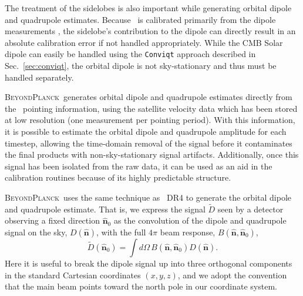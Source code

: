 \documentclass[twocolumn]{aa}
\newcommand{\BP}{\textsc{BeyondPlanck}}
\begin{document}
The treatment of the sidelobes is also important while generating orbital dipole and quadrupole estimates. Because \Planck\ is calibrated primarily from the dipole measurements \citep{planck2016-l01,npipe,BP07}, the sidelobe's contribution to the dipole can directly result in an absolute calibration error if not handled appropriately. While the CMB Solar dipole can easily be handled using the \texttt{Conviqt} approach described in Sec.~\ref{sec:conviqt}, the orbital dipole is not sky-stationary and thus must be handled separately. 

\BP\ generates orbital dipole and quadrupole estimates directly from the \Planck\ pointing information, using the satellite velocity data which has been stored at low resolution (one measurement per pointing period). With this information, it is possible to estimate the orbital dipole and quadrupole amplitude for each timestep, allowing the time-domain removal of the signal before it contaminates the final products with non-sky-stationary signal artifacts. Additionally, once this signal has been isolated from the raw data, it can be used as an aid in the calibration routines because of its highly predictable structure.


\BP\ uses the same technique as \Planck\ DR4 \citep[see appendix C]{npipe} to generate the orbital dipole and quadrupole estimate. That is, we express the signal $\tilde{D}$ seen by a detector observing a fixed direction $\hat{\boldsymbol n}_0$ as the convolution of the dipole and quadrupole signal on the sky, $D(\hat{\boldsymbol n})$, with the full $4\pi$ beam response, $B(\hat{\boldsymbol n}, \hat{\boldsymbol n}_0)$,
\begin{equation}
\tilde{D}(\hat{\boldsymbol n}_0) = \int d\Omega\, B(\hat{\boldsymbol n}, \hat{\boldsymbol n}_0) D(\hat{\boldsymbol n}).
\end{equation}
Here it is useful to break the dipole signal up into three orthogonal components in the standard Cartesian coordinates $(x,y,z)$, and we adopt the convention that the main beam points toward the north pole in our coordinate system.
\end{document}
